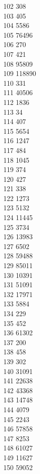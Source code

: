 { 102	308 \\
 103	405 \\
 104	5586 \\
 105	76496 \\
 106	270 \\
 107	421 \\
 108	95809 \\
 109	118890 \\
 110	331 \\
 111	40506 \\
 112	1836 \\
 113	34 \\
 114	407 \\
 115	5654 \\
 116	1247 \\
 117	484 \\
 118	1045 \\
 119	374 \\
 120	427 \\
 121	338 \\
 122	1273 \\
 123	5132 \\
 124	11445 \\
 125	3734 \\
 126	13983 \\
 127	6502 \\
 128	59488 \\
 129	85011 \\
 130	10391 \\
 131	51091 \\
 132	17971 \\
 133	5884 \\
 134	229 \\
 135	452 \\
 136	61302 \\
 137	200 \\
 138	458 \\
 139	302 \\
 140	31091 \\
 141	22638 \\
 142	43368 \\
 143	14748 \\
 144	4079 \\
 145	2243 \\
 146	57858 \\
 147	8253 \\
 148	61027 \\
 149	11627 \\
 150	59052 \\
}

